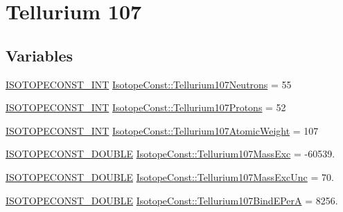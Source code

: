 \hypertarget{group___isotope_const-_tellurium-_te107}{}\section{Tellurium 107}
\label{group___isotope_const-_tellurium-_te107}
\subsection*{Variables}
\begin{DoxyCompactItemize}
\item 
\mbox{\hyperlink{group___isotope_const-_macros_ga5f18360b3e99483a35c32d789e62621c}{I\+S\+O\+T\+O\+P\+E\+C\+O\+N\+S\+T\+\_\+\+I\+NT}} \mbox{\hyperlink{group___isotope_const-_tellurium-_te107_ga52cebdc50689673ea0fafb0fed0ae896}{Isotope\+Const\+::\+Tellurium107\+Neutrons}} = 55
\item 
\mbox{\hyperlink{group___isotope_const-_macros_ga5f18360b3e99483a35c32d789e62621c}{I\+S\+O\+T\+O\+P\+E\+C\+O\+N\+S\+T\+\_\+\+I\+NT}} \mbox{\hyperlink{group___isotope_const-_tellurium-_te107_gac4f8b073d845bb260dca28fe83b9511e}{Isotope\+Const\+::\+Tellurium107\+Protons}} = 52
\item 
\mbox{\hyperlink{group___isotope_const-_macros_ga5f18360b3e99483a35c32d789e62621c}{I\+S\+O\+T\+O\+P\+E\+C\+O\+N\+S\+T\+\_\+\+I\+NT}} \mbox{\hyperlink{group___isotope_const-_tellurium-_te107_ga2388df27b235f9f57e02e3e147811fb4}{Isotope\+Const\+::\+Tellurium107\+Atomic\+Weight}} = 107
\item 
\mbox{\hyperlink{group___isotope_const-_macros_ga8f45a7272ce02c0b4c65c44636ed719a}{I\+S\+O\+T\+O\+P\+E\+C\+O\+N\+S\+T\+\_\+\+D\+O\+U\+B\+LE}} \mbox{\hyperlink{group___isotope_const-_tellurium-_te107_ga181e1a38afe07a5663fae18eb6f62923}{Isotope\+Const\+::\+Tellurium107\+Mass\+Exc}} = -\/60539.
\item 
\mbox{\hyperlink{group___isotope_const-_macros_ga8f45a7272ce02c0b4c65c44636ed719a}{I\+S\+O\+T\+O\+P\+E\+C\+O\+N\+S\+T\+\_\+\+D\+O\+U\+B\+LE}} \mbox{\hyperlink{group___isotope_const-_tellurium-_te107_gaa3797e7cd4a4103c0685457d6d638e25}{Isotope\+Const\+::\+Tellurium107\+Mass\+Exc\+Unc}} = 70.
\item 
\mbox{\hyperlink{group___isotope_const-_macros_ga8f45a7272ce02c0b4c65c44636ed719a}{I\+S\+O\+T\+O\+P\+E\+C\+O\+N\+S\+T\+\_\+\+D\+O\+U\+B\+LE}} \mbox{\hyperlink{group___isotope_const-_tellurium-_te107_ga1a9a3da8ab664d6151cb5ad56ecf7d0b}{Isotope\+Const\+::\+Tellurium107\+Bind\+E\+PerA}} = 8256.
\item 

\end{DoxyCompactItemize}
